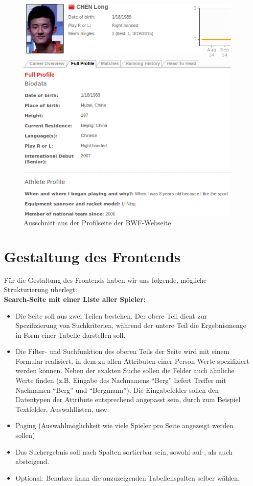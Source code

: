 \begin{figure}[H]
\centering
\includegraphics[scale=0.4]{images/bwf_profile}
\caption{Ausschnitt aus der Profilseite der BWF-Webseite}
\label{fig:bwf_profile}
\end{figure}

\section{Gestaltung des Frontends}
Für die Gestaltung des Frontends haben wir uns folgende, mögliche Strukturierung überlegt:\\

\noindent\textbf{Search-Seite mit einer Liste aller Spieler:}
\begin{itemize}
\item Die Seite soll aus zwei Teilen bestehen. Der obere Teil dient zur Spezifizierung von Suchkriterien, während der untere Teil die Ergebnismenge in Form einer Tabelle darstellen soll.
\item Die Filter- und Suchfunktion des oberen Teils der Seite wird mit einem Formular realisiert, in dem zu allen Attributen einer Person Werte spezifiziert werden können. Neben der exakten Suche sollen die Felder auch ähnliche Werte finden (z.B. Eingabe des Nachnamens "`Berg"' liefert Treffer mit Nachnamen "`Berg"' und "`Bergmann"'). Die Eingabefelder sollen den Datentypen der Attribute entsprechend angepasst sein, durch zum Beispiel Textfelder, Auswahllisten, usw.
\item Paging (Auswahlmöglichkeit wie viele Spieler pro Seite angezeigt werden sollen)
\item Das Suchergebnis soll nach Spalten sortierbar sein, sowohl auf-, als auch absteigend.
\item Optional: Benutzer kann die anzuzeigenden Tabellenspalten selber wählen.
\end{itemize}

